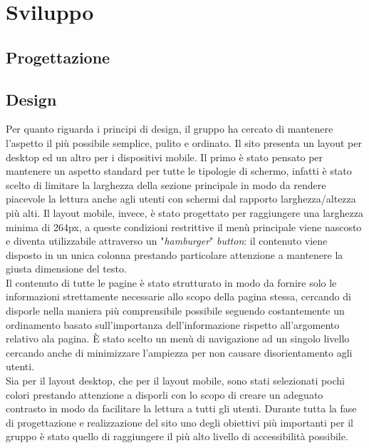 \section{Sviluppo}

\subsection{Progettazione}

\subsection{Design}\label{design}
Per quanto riguarda i principi di design, il gruppo ha cercato di mantenere l'aspetto il più possibile semplice, pulito e ordinato. Il sito presenta un layout per desktop ed un altro per i dispositivi mobile. Il primo è stato pensato per mantenere un aspetto standard per tutte le tipologie di schermo, infatti è stato scelto di limitare la larghezza della sezione principale in modo da rendere piacevole la lettura anche agli utenti con schermi dal rapporto larghezza/altezza più alti. Il layout mobile, invece, è stato progettato per raggiungere una larghezza minima di 264px, a queste condizioni restrittive il menù principale viene nascosto e diventa utilizzabile attraverso un "\textit{hamburger}" \textit{button}: il contenuto viene disposto in un unica colonna prestando particolare attenzione a mantenere la giusta dimensione del testo.\\
Il contenuto di tutte le pagine è stato strutturato in modo da fornire solo le informazioni strettamente necessarie allo scopo della pagina stessa, cercando di disporle nella maniera più comprensibile possibile seguendo costantemente un ordinamento basato sull'importanza dell'informazione rispetto all'argomento relativo ala pagina. È stato scelto un menù di navigazione ad un singolo livello cercando anche di minimizzare l'ampiezza per non causare disorientamento agli utenti.\\
Sia per il layout desktop, che per il layout mobile, sono stati selezionati pochi colori prestando attenzione a disporli con lo scopo di creare un adeguato contrasto in modo da facilitare la lettura a tutti gli utenti. Durante tutta la fase di progettazione e realizzazione del sito uno degli obiettivi più importanti per il gruppo è stato quello di raggiungere il più alto livello di accessibilità possibile.

